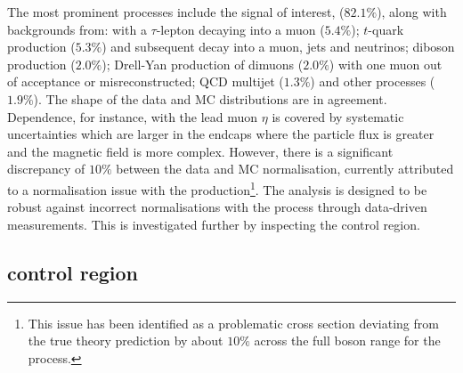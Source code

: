 The most prominent processes include the signal of interest, \IWmvj ($82.1\%$), along with backgrounds from: \IWlv with a $\tau$-lepton decaying into a muon ($5.4\%$); $t$-quark production ($5.3\%$) and subsequent decay into a muon, jets and neutrinos; diboson production ($2.0\%$); Drell-Yan production of dimuons ($2.0\%$) with one muon out of acceptance or misreconstructed; QCD multijet ($1.3\%$) and other processes ($1.9\%$). The shape of the data and MC distributions are in agreement. Dependence, for instance, with the lead muon $\eta$ is covered by systematic uncertainties which are larger in the endcaps where the particle flux is greater and the magnetic field is more complex. However, there is a significant discrepancy of $10\%$ between the data and MC normalisation, currently attributed to a normalisation issue with the \IWj production\footnote{This issue has been identified as a problematic cross section deviating from the true theory prediction by about $10\%$ across the full boson \pt range for the \IWj process.}. The analysis is designed to be robust against incorrect normalisations with the \IVj process through data-driven measurements. This is investigated further by inspecting the \eleplusjets control region.


\subsection{\eleplusjets control region}


